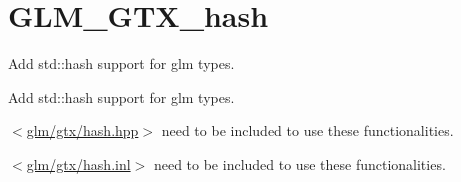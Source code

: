 \hypertarget{group__gtx__hash}{}\section{G\+L\+M\+\_\+\+G\+T\+X\+\_\+hash}
\label{group__gtx__hash}


Add std\+::hash support for glm types.  


Add std\+::hash support for glm types. 

$<$\mbox{\hyperlink{hash_8hpp}{glm/gtx/hash.\+hpp}}$>$ need to be included to use these functionalities.

$<$\mbox{\hyperlink{hash_8inl}{glm/gtx/hash.\+inl}}$>$ need to be included to use these functionalities. 